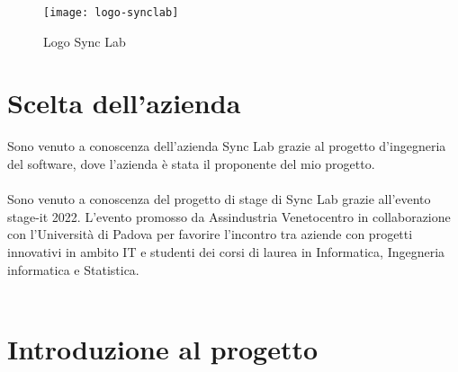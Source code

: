 \begin{figure}[H]
    \centering
    \texttt{[image: logo-synclab]}
    \caption{Logo Sync Lab}
\end{figure}

\section{Scelta dell'azienda}
Sono venuto a conoscenza dell'azienda Sync Lab grazie al progetto d'ingegneria del
software, dove l'azienda è stata il proponente del mio progetto.
\\\\
Sono venuto a conoscenza del progetto di stage di Sync Lab grazie all'evento stage-it 2022. 
L’evento promosso da Assindustria Venetocentro in collaborazione con l’Università 
di Padova per favorire l’incontro tra aziende con progetti innovativi in ambito \gls{IT} e 
studenti dei corsi di laurea in Informatica, Ingegneria informatica e Statistica.
\\\\


\section{Introduzione al progetto}

